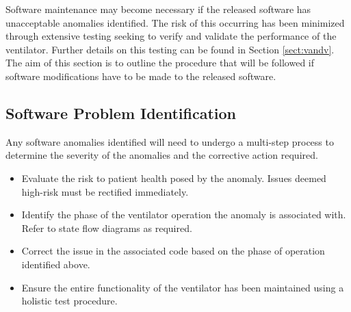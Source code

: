 \documentclass[]{article}
\begin{document}
Software maintenance may become necessary if the released software has unacceptable anomalies identified.  The risk of this occurring has been minimized through extensive testing seeking to verify and validate the performance of the ventilator.  Further details on this testing can be found in Section \ref{sect:vandv}.  The aim of this section is to outline the procedure that will be followed if software modifications have to be made to the released software.

\subsection{Software Problem Identification}
Any software anomalies identified will need to undergo a multi-step process to determine the severity of the anomalies and the corrective action required.

\begin{itemize}
	\item Evaluate the risk to patient health posed by the anomaly.  Issues deemed high-risk must be rectified immediately.
	\item Identify the phase of the ventilator operation the anomaly is associated with.  Refer to state flow diagrams as required.
	\item Correct the issue in the associated code based on the phase of operation identified above.
	\item Ensure the entire functionality of the ventilator has been maintained using a holistic test procedure.
\end{itemize}
\end{document}

